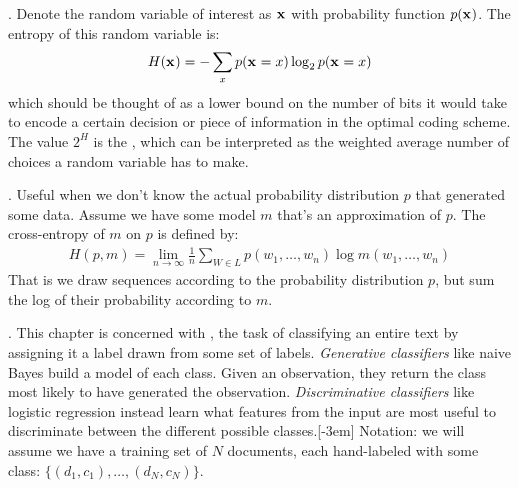 \documentclass[11pt]{article}
\newcommand\myspace[1][]{\vspace{#1\bigskipamount}}
\newcommand\p{\Needspace{10\baselineskip} \noindent}
\begin{document}
\myspace
\p {}. Denote the random variable of interest as $\mathbf{x}_{}$ with probability function $p(\mathbf{x}_{})$. The entropy of this random variable is:
\begin{align}
	H(\mathbf{x}_{}) = -\sum_x p(\mathbf{x}_{} = x) \log_2 p(\mathbf{x}_{} = x)
\end{align}
which should be thought of as a lower bound on the number of bits it would take to encode a certain decision or piece of information in the optimal coding scheme. The value $2^H$ is the , which can be interpreted as the weighted average number of choices a random variable has to make.

\myspace
\p {}. Useful when we don't know the actual probability distribution $p$ that generated some data. Assume we have some model $m$ that's an approximation of $p$. The cross-entropy of $m$ on $p$ is defined by:
\begin{align}
	H(p, m) = \lim_{n \rightarrow \infty} \frac{1}{n} \sum_{W \in L} 
	p(w_1, \ldots, w_n) \log m(w_1, \ldots, w_n)
\end{align}
That is we draw sequences according to the probability distribution $p$, but sum the log of their probability according to $m$.















\p {}. This chapter is concerned with , the task of classifying an entire text by assigning it a label drawn from some set of labels. \textit{Generative classifiers} like naive Bayes build a model of each class. Given an observation, they return the class most likely to have generated the observation. \textit{Discriminative classifiers} like logistic regression instead learn what features from the input are most useful to discriminate between the different possible classes.[-3em] Notation: we will assume we have a training set of $N$ documents, each hand-labeled with some class: $\{(d_1, c_1), \ldots, (d_N, c_N) \}$. 
\end{document}
